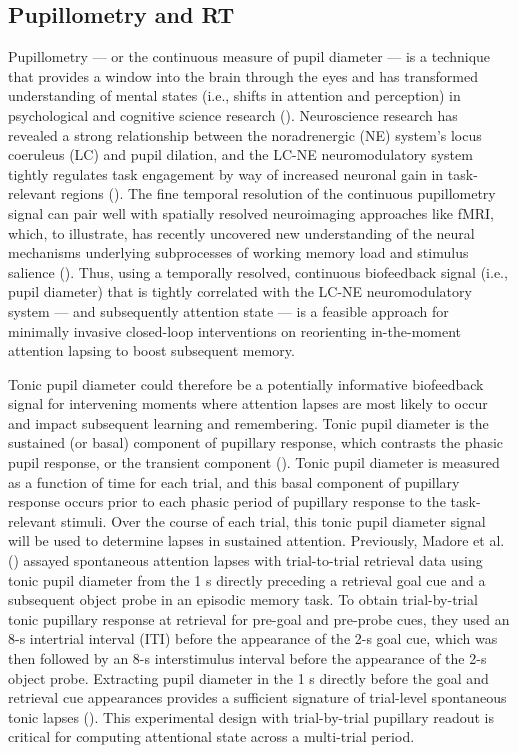 \subsection{Pupillometry and RT}
Pupillometry --- or the continuous measure of pupil diameter --- is a technique that provides a window into the brain through the eyes and has transformed understanding of mental states (i.e., shifts in attention and perception) in psychological and cognitive science research (\cite{laeng2012pupillometry, hess1960pupil, hess1964pupil, kahneman1966pupil}). Neuroscience research has revealed a strong relationship between the noradrenergic (NE) system's locus coeruleus (LC) and pupil dilation, and the LC-NE neuromodulatory system tightly regulates task engagement by way of increased neuronal gain in task-relevant regions (\cite{laeng2012pupillometry, murphy2011pupillometry, wilhelm1999pupillography, aston2005integrative, berridge2003locus, aston1981nonrepinephrine, sara2009locus, foote1980impulse}). The fine temporal resolution of the continuous pupillometry signal can pair well with spatially resolved neuroimaging approaches like fMRI, which, to illustrate, has recently uncovered new understanding of the neural mechanisms underlying subprocesses of working memory load and stimulus salience (\cite{fietz2021pupillometry}). Thus, using a temporally resolved, continuous biofeedback signal (i.e., pupil diameter) that is tightly correlated with the LC-NE neuromodulatory system --- and subsequently attention state --- is a feasible approach for minimally invasive closed-loop interventions on reorienting in-the-moment attention lapsing to boost subsequent memory.

Tonic pupil diameter could therefore be a potentially informative biofeedback signal for intervening moments where attention lapses are most likely to occur and impact subsequent learning and remembering. Tonic pupil diameter is the sustained (or basal) component of pupillary response, which contrasts the phasic pupil response, or the transient component (\cite{beatty1982phasic, peysakhovich2017impact}). Tonic pupil diameter is measured as a function of time for each trial, and this basal component of pupillary response occurs prior to each phasic period of pupillary response to the task-relevant stimuli. Over the course of each trial, this tonic pupil diameter signal will be used to determine lapses in sustained attention. Previously, Madore et al. (\cite*{madore2020memory}) assayed spontaneous attention lapses with trial-to-trial retrieval data using tonic pupil diameter from the 1 s directly preceding a retrieval goal cue and a subsequent object probe in an episodic memory task. To obtain trial-by-trial tonic pupillary response at retrieval for pre-goal and pre-probe cues, they used an 8-s intertrial interval (ITI) before the appearance of the 2-s goal cue, which was then followed by an 8-s interstimulus interval before the appearance of the 2-s object probe. Extracting pupil diameter in the 1 s directly before the goal and retrieval cue appearances provides a sufficient signature of trial-level spontaneous tonic lapses (\cite{madore2020memory}). This experimental design with trial-by-trial pupillary readout is critical for computing attentional state across a multi-trial period. 

